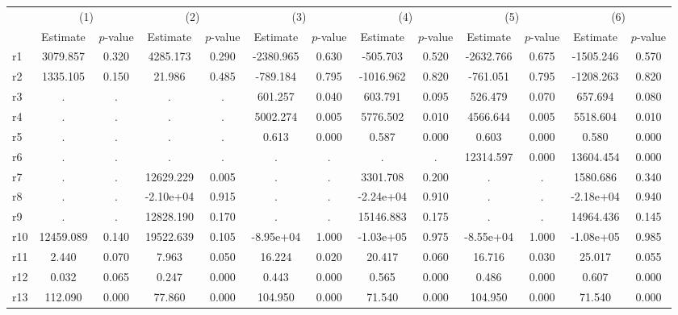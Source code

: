 \begin{tabular}{lcccccccccccc} \toprule
 & \multicolumn{2}{c}{(1)}  &  \multicolumn{2}{c}{(2)}  &  \multicolumn{2}{c}{(3)}  &  \multicolumn{2}{c}{(4)}  & \multicolumn{2}{c}{(5)} & \multicolumn{2}{c}{(6)} \\  
 & Estimate & $p$-value & Estimate & $p$-value & Estimate & $p$-value & Estimate & $p$-value & Estimate & $p$-value & Estimate & $p$-value \\ \midrule
r1 &  3079.857 &     0.320 &  4285.173 &     0.290 & -2380.965 &     0.630 &  -505.703 &     0.520 & -2632.766 &     0.675 & -1505.246 &     0.570 \\  
r2 &  1335.105 &     0.150 &    21.986 &     0.485 &  -789.184 &     0.795 & -1016.962 &     0.820 &  -761.051 &     0.795 & -1208.263 &     0.820 \\  
r3 &         . &         . &         . &         . &   601.257 &     0.040 &   603.791 &     0.095 &   526.479 &     0.070 &   657.694 &     0.080 \\  
r4 &         . &         . &         . &         . &  5002.274 &     0.005 &  5776.502 &     0.010 &  4566.644 &     0.005 &  5518.604 &     0.010 \\  
r5 &         . &         . &         . &         . &     0.613 &     0.000 &     0.587 &     0.000 &     0.603 &     0.000 &     0.580 &     0.000 \\  
r6 &         . &         . &         . &         . &         . &         . &         . &         . & 12314.597 &     0.000 & 13604.454 &     0.000 \\  
r7 &         . &         . & 12629.229 &     0.005 &         . &         . &  3301.708 &     0.200 &         . &         . &  1580.686 &     0.340 \\  
r8 &         . &         . & -2.10e+04 &     0.915 &         . &         . & -2.24e+04 &     0.910 &         . &         . & -2.18e+04 &     0.940 \\  
r9 &         . &         . & 12828.190 &     0.170 &         . &         . & 15146.883 &     0.175 &         . &         . & 14964.436 &     0.145 \\  
r10 & 12459.089 &     0.140 & 19522.639 &     0.105 & -8.95e+04 &     1.000 & -1.03e+05 &     0.975 & -8.55e+04 &     1.000 & -1.08e+05 &     0.985 \\  
r11 &     2.440 &     0.070 &     7.963 &     0.050 &    16.224 &     0.020 &    20.417 &     0.060 &    16.716 &     0.030 &    25.017 &     0.055 \\  
r12 &     0.032 &     0.065 &     0.247 &     0.000 &     0.443 &     0.000 &     0.565 &     0.000 &     0.486 &     0.000 &     0.607 &     0.000 \\  
r13 &   112.090 &     0.000 &    77.860 &     0.000 &   104.950 &     0.000 &    71.540 &     0.000 &   104.950 &     0.000 &    71.540 &     0.000 \\  
\bottomrule \end{tabular}

